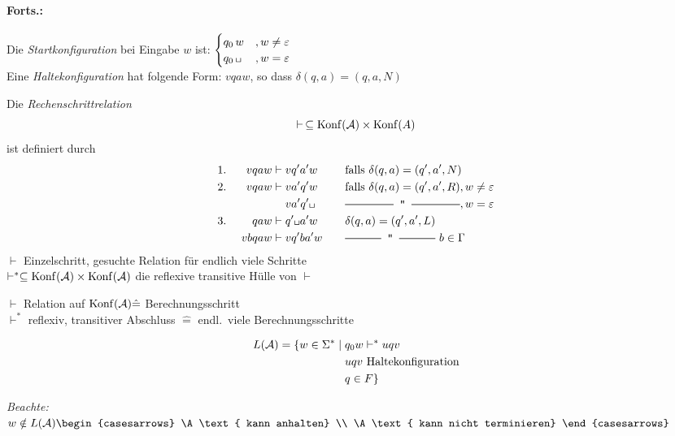 \paragraph{Forts.:} Die \emph{Startkonfiguration} bei Eingabe $w$ ist:
$\begin{cases}
q_0\,w &, w\neq\Eps\\
q_0\,\blank &, w=\Eps
\end{cases}$\\
Eine \emph{Haltekonfiguration} hat folgende Form: $vqaw$, so dass $\delta(q,a)=(q,a,N)$

\begin{Def}[name={[Rechenschrittrelation]}] %
	Die \emph{Rechenschrittrelation}
	\[ \vdash\, \subseteq \operatorname{Konf}(\mathcal{A})\times\operatorname{Konf}(A) \]
	ist definiert durch
	\begin{alignat*}{3}
		1.&\ & v qaw &\vdash v q'a'w &\quad& \text{falls }\delta(q,a)=(q',a',N)\\
		2.&& v qaw &\vdash v a'q'w && \text{falls }\delta(q,a)=(q',a',R), w\neq \Eps\\
		&&&\phantom{{}\vdash{}} v a'q'\blank && \ruleplaceholder{\widthof{falls $\delta(q,a)=(q',a',R)$}}, w=\Eps\\
		3.&& qaw &\vdash q'\blank a'w && \delta(q,a)=(q',a',L)\\
		&& vbqaw &\vdash vq'ba'w && \ruleplaceholder{\widthof{$\delta(q,a)=(q',a',L)$}}\  b\in\Gamma
	\end{alignat*}
	$\vdash$ Einzelschritt, gesuchte Relation für endlich viele Schritte \smallskip\\
	$\vdash^* \subseteq \operatorname{Konf}(\mathcal{A}) \times \operatorname{Konf}(\mathcal{A})$ die reflexive transitive Hülle von $\vdash$
\end{Def}


$\vdash$ Relation auf $\operatorname{Konf}(\mathcal{A})\hat=$ Berechnungsschritt\\
$\vdash^*$ reflexiv, transitiver Abschluss $\hat=$ endl.\ viele Berechnungsschritte
%
%
\begin{Def} %
	\begin{align*}
		L(\mathcal{A})=\{ w\in\Sigma^* \mid{}
		& q_0 w \vdash^*uqv\\
		&uqv \text{ Haltekonfiguration}\\
		&q\in F\}
	\end{align*}
\end{Def}
\emph{Beachte:}
$w\notin L(\A)\begin{casesarrows}
\A\text{ kann anhalten}          \\
\A\text{ kann nicht terminieren}
\end{casesarrows}$


